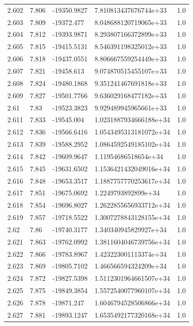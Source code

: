 \begin{tabular}{lllll}
2.602 & 7.806 & -19350.9827 & 7.810813437676744e+33 & 1.0 \\
2.603 & 7.809 & -19372.477 & 8.048688120719065e+33 & 1.0 \\
2.604 & 7.812 & -19393.9871 & 8.293807166372899e+33 & 1.0 \\
2.605 & 7.815 & -19415.5131 & 8.546391198325012e+33 & 1.0 \\
2.606 & 7.818 & -19437.0551 & 8.806667559254449e+33 & 1.0 \\
2.607 & 7.821 & -19458.613 & 9.074870515455107e+33 & 1.0 \\
2.608 & 7.824 & -19480.1868 & 9.351241467691818e+33 & 1.0 \\
2.609 & 7.827 & -19501.7766 & 9.636029168477182e+33 & 1.0 \\
2.61 & 7.83 & -19523.3823 & 9.929489945965661e+33 & 1.0 \\
2.611 & 7.833 & -19545.004 & 1.0231887934666188e+34 & 1.0 \\
2.612 & 7.836 & -19566.6416 & 1.0543495313181072e+34 & 1.0 \\
2.613 & 7.839 & -19588.2952 & 1.0864592549185102e+34 & 1.0 \\
2.614 & 7.842 & -19609.9647 & 1.11954686518654e+34 & 1.0 \\
2.615 & 7.845 & -19631.6502 & 1.1536421432049016e+34 & 1.0 \\
2.616 & 7.848 & -19653.3517 & 1.1887757770253617e+34 & 1.0 \\
2.617 & 7.851 & -19675.0692 & 1.2249793892899e+34 & 1.0 \\
2.618 & 7.854 & -19696.8027 & 1.2622855656933712e+34 & 1.0 \\
2.619 & 7.857 & -19718.5522 & 1.3007278843128155e+34 & 1.0 \\
2.62 & 7.86 & -19740.3177 & 1.340340945829927e+34 & 1.0 \\
2.621 & 7.863 & -19762.0992 & 1.3811604046739756e+34 & 1.0 \\
2.622 & 7.866 & -19783.8967 & 1.423223001113374e+34 & 1.0 \\
2.623 & 7.869 & -19805.7102 & 1.466566594324209e+34 & 1.0 \\
2.624 & 7.872 & -19827.5398 & 1.5112301964661507e+34 & 1.0 \\
2.625 & 7.875 & -19849.3854 & 1.5572540077960107e+34 & 1.0 \\
2.626 & 7.878 & -19871.247 & 1.6046794528506866e+34 & 1.0 \\
2.627 & 7.881 & -19893.1247 & 1.6535492177320168e+34 & 1.0 \\

\end{tabular}
